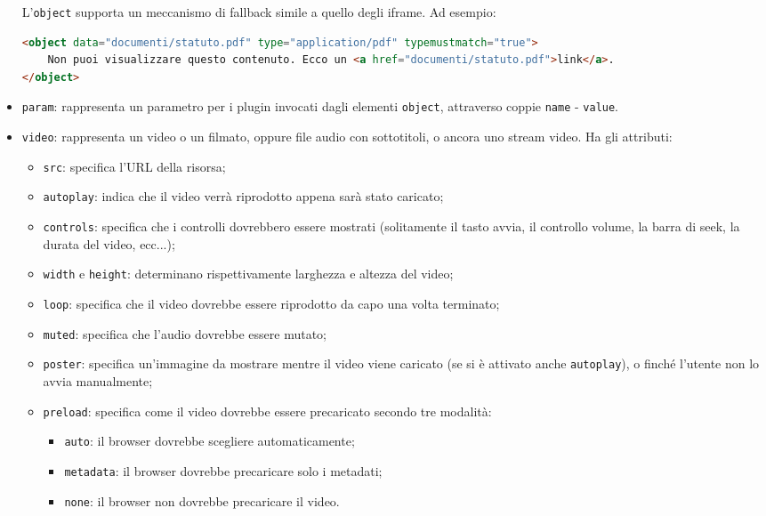 \documentclass[a4paper,11pt]{article}
\begin{document}
\begin{itemize}
		L'\lstinline|object| supporta un meccanismo di fallback simile a quello degli iframe. Ad esempio:
\begin{lstlisting}[language=html, style=codestyle]	
<object data="documenti/statuto.pdf" type="application/pdf" typemustmatch="true">
	Non puoi visualizzare questo contenuto. Ecco un <a href="documenti/statuto.pdf">link</a>.
</object>
\end{lstlisting}
	\item \lstinline|param|: rappresenta un parametro per i plugin invocati dagli elementi \lstinline|object|, attraverso coppie \lstinline|name| - \lstinline|value|.

	\item \lstinline|video|: rappresenta un video o un filmato, oppure file audio con sottotitoli, o ancora uno stream video. Ha gli attributi:
		\begin{itemize}
			\item \lstinline|src|: specifica l'URL della risorsa;
			\item \lstinline|autoplay|: indica che il video verrà riprodotto appena sarà stato caricato;
			\item \lstinline|controls|: specifica che i controlli dovrebbero essere mostrati (solitamente il tasto avvia, il controllo volume, la barra di seek, la durata del video, ecc...);
			\item \lstinline|width| e \lstinline|height|: determinano rispettivamente larghezza e altezza del video;
			\item \lstinline|loop|: specifica che il video dovrebbe essere riprodotto da capo una volta terminato;
			\item \lstinline|muted|: specifica che l'audio dovrebbe essere mutato;
			\item \lstinline|poster|: specifica un'immagine da mostrare mentre il video viene caricato (se si è attivato anche \lstinline|autoplay|), o finché l'utente non lo avvia manualmente;
			\item \lstinline|preload|: specifica come il video dovrebbe essere precaricato secondo tre modalità:
				\begin{itemize}
					\item \lstinline|auto|: il browser dovrebbe scegliere automaticamente;
					\item \lstinline|metadata|: il browser dovrebbe precaricare solo i metadati;
					\item \lstinline|none|: il browser non dovrebbe precaricare il video.
				\end{itemize}
				

\end{itemize}
\end{itemize}
\end{document}
